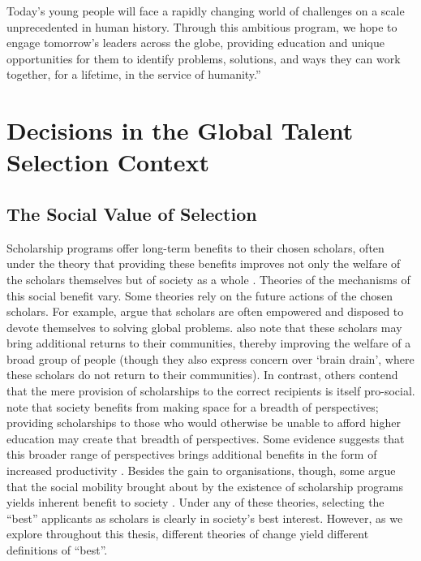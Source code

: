\begin{savequote}[8cm]
Today’s young people will face a rapidly changing world of challenges on a scale unprecedented in human history. Through this ambitious program, we hope to engage tomorrow’s leaders across the globe, providing education and unique opportunities for them to identify problems, solutions, and ways they can work together, for a lifetime, in the service of humanity.”
\end{savequote}

\chapter{\label{ch:context}Decisions in the Global Talent Selection Context}
\minitoc

\section{The Social Value of Selection}\label{sec:social_value}

Scholarship programs offer long-term benefits to their chosen scholars, often under the theory that providing these benefits improves not only the welfare of the scholars themselves but of society as a whole \cite{DilraboJonbekova_Ruby_2023,Dassin_Marsh_Mawer_2018}. Theories of the mechanisms of this social benefit vary. Some theories rely on the future actions of the chosen scholars. For example, \textcite{Dassin_Marsh_Mawer_2018} argue that scholars are often empowered and disposed to devote themselves to solving global problems. \textcite{Dassin_Marsh_Mawer_2018} also note that these scholars may bring additional returns to their communities, thereby improving the welfare of a broad group of people (though they also express concern over `brain drain', where these scholars do not return to their communities). In contrast, others contend that the mere provision of scholarships to the correct recipients is itself pro-social. \textcite{minkin2023diversity} note that society benefits from making space for a breadth of perspectives; providing scholarships to those who would otherwise be unable to afford higher education may create that breadth of perspectives. Some evidence suggests that this broader range of perspectives brings additional benefits in the form of increased productivity \cite{autor2008does,noray2023systemic}. Besides the gain to organisations, though, some argue that the social mobility brought about by the existence of scholarship programs yields inherent benefit to society \cite{Dassin_Marsh_Mawer_2018}. Under any of these theories, selecting the ``best'' applicants as scholars is clearly in society's best interest. However, as we explore throughout this thesis, different theories of change yield different definitions of ``best''.

